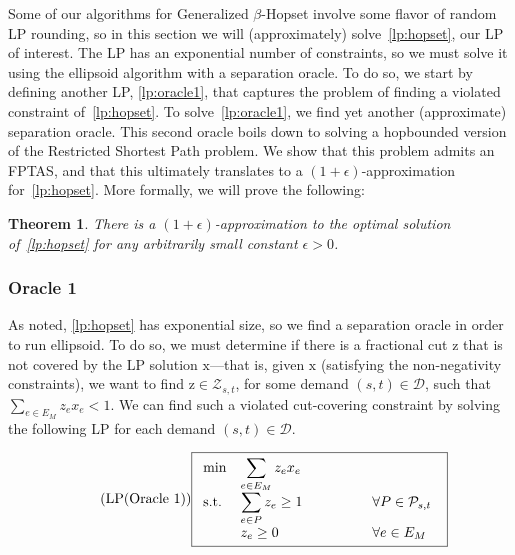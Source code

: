 \documentclass{article}
\newtheorem{theorem}{Theorem}[section]
\theoremstyle{definition}
\theoremstyle{remark}
\def\hopset {{\sc Generalized $\beta$-Hopset}}
\begin{document}
Some of our algorithms for {\hopset} involve some flavor of random LP rounding, so in this section we will (approximately) solve~\ref{lp:hopset}, our LP of interest. The LP has an exponential number of constraints, so we must solve it using the ellipsoid algorithm with a separation oracle. To do so, we start by defining another LP, \ref{lp:oracle1}, that captures the problem of finding a violated constraint of~\ref{lp:hopset}. To solve~\ref{lp:oracle1}, we find yet another (approximate) separation oracle. This second oracle boils down to solving a hopbounded version of the Restricted Shortest Path problem. We show that this problem admits an FPTAS, and that this ultimately translates to a $(1+\epsilon)$-approximation for~\ref{lp:hopset}. More formally, we will prove the following:

\begin{theorem} \label{thm:solve_LP}
    There is a $(1+\epsilon)$-approximation to the optimal solution of~\ref{lp:hopset} for any arbitrarily small constant $\epsilon > 0$.
\end{theorem}

\subsubsection{Oracle 1}
As noted, \ref{lp:hopset} has exponential size, so we find a separation oracle in order to run ellipsoid. To do so, we must determine if there is a fractional cut $\bm{\mathrm{z}}$ that is not covered by the LP solution $\bm{\mathrm{x}}$---that is, given $\bm{\mathrm{x}}$ (satisfying the non-negativity constraints), we want to find $\bm{\mathrm{z}} \in \mathcal{Z}_{s,t}$, for some demand $(s,t) \in \mathcal{D}$, such that $\sum_{e \in E_M} z_e x_e < 1$. We can find such a violated cut-covering constraint by solving the following LP for each demand $(s,t) \in \mathcal{D}$.

\begin{equation} \label{lp:oracle1} \tag{LP(Oracle 1)}
\fbox{$
\begin{array}{lll}
\min & \displaystyle \sum_{e \in E_M} z_e x_e \\
\mathrm{s.t.} & \displaystyle \sum_{e \in P} z_e \geq 1 \qquad \qquad & \forall P \in \mathcal{P}_{s,t} \\
& \displaystyle z_e \geq 0 & \forall e \in E_M
\end{array}
$
}
\end{equation}
\end{document}
